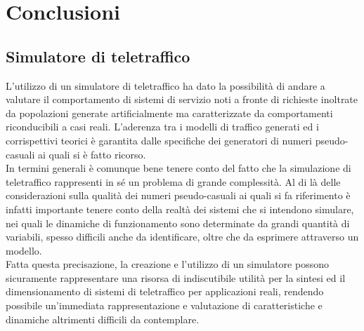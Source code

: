 \chapter{Conclusioni}

\section{Simulatore di teletraffico}

L'utilizzo di un simulatore di teletraffico ha dato la possibilit\`a di andare a valutare il comportamento di sistemi di servizio noti a fronte di richieste inoltrate da popolazioni generate artificialmente ma caratterizzate da comportamenti riconducibili a casi reali. L'aderenza tra i modelli di traffico generati ed i corrispettivi teorici \`e garantita dalle specifiche dei generatori di numeri pseudo-casuali ai quali si \`e fatto ricorso.
\\

In termini generali \`e comunque bene tenere conto del fatto che la simulazione di teletraffico rappresenti in s\'e un problema di grande complessit\`a. Al di l\`a delle considerazioni sulla qualit\`a dei numeri pseudo-casuali ai quali si fa riferimento \`e infatti importante tenere conto della realt\`a dei sistemi che si intendono simulare, nei quali le dinamiche di funzionamento sono determinate da grandi quantit\`a di variabili, spesso difficili anche da identificare, oltre che da esprimere attraverso un modello. 
\\

Fatta questa precisazione, la creazione e l'utilizzo di un simulatore possono sicuramente rappresentare una risorsa di indiscutibile utilit\`a per la sintesi ed il dimensionamento di sistemi di teletraffico per applicazioni reali, rendendo possibile un'immediata rappresentazione e valutazione di caratteristiche e dinamiche altrimenti difficili da contemplare.
